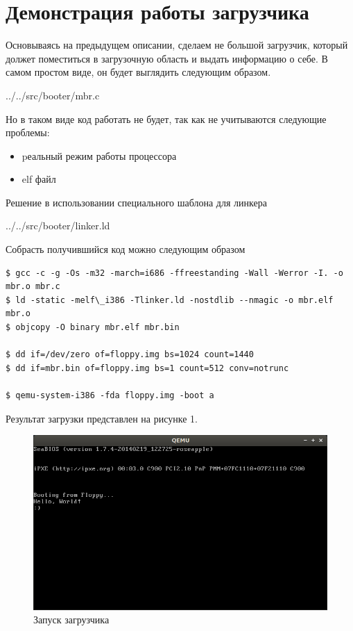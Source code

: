 \newpage
\section{Демонстрация работы загрузчика}

Основываясь на предыдущем описании, сделаем не большой загрузчик, который должет поместиться в загрузочную область и выдать информацию о себе. В самом простом виде, он будет выглядить следующим образом.


{../../src/booter/mbr.c}

Но в таком виде код работать не будет, так как не учитываются следующие проблемы:
\begin{itemize}
\item pеальный режим работы процессора
\item elf файл
\end{itemize}

Решение в использовании специального шаблона для линкера


{../../src/booter/linker.ld}

Собрасть получившийся код можно следующим образом

\begin{Verbatim}[frame=single]
$ gcc -c -g -Os -m32 -march=i686 -ffreestanding -Wall -Werror -I. -o mbr.o mbr.c
$ ld -static -melf\_i386 -Tlinker.ld -nostdlib --nmagic -o mbr.elf mbr.o
$ objcopy -O binary mbr.elf mbr.bin

$ dd if=/dev/zero of=floppy.img bs=1024 count=1440
$ dd if=mbr.bin of=floppy.img bs=1 count=512 conv=notrunc

$ qemu-system-i386 -fda floppy.img -boot a
\end{Verbatim}

Результат загрузки представлен на рисунке 1.

\begin{figure}[h!]
\centering
\includegraphics[scale=0.7]{res/qemu}
\caption{Запуск загрузчика}
\end{figure}